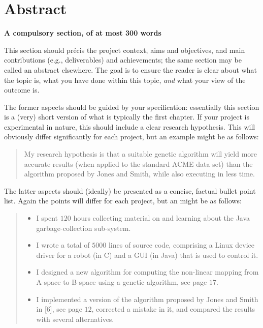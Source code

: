\documentclass[oneside,%
                    author={Malak Hajji},
                    degree={BSc},
                    title={Designing An Accessible Computational Toolkit For Students},
                  subtitle={With Mixed Visual Abilities}]{dissertation}
\begin{document}
\frontmatter





\chapter*{Abstract}

{\bf A compulsory section, of at most 300 words} 
\vspace{1cm} 

\noindent
This section should pr\'{e}cis the project context, aims and objectives,
and main contributions (e.g., deliverables) and achievements; the same 
section may be called an abstract elsewhere.  The goal is to ensure the 
reader is clear about what the topic is, what you have done within this 
topic, {\em and} what your view of the outcome is.

The former aspects should be guided by your specification: essentially 
this section is a (very) short version of what is typically the first 
chapter. If your project is experimental in nature, this should include 
a clear research hypothesis.  This will obviously differ significantly
for each project, but an example might be as follows:

\begin{quote}
My research hypothesis is that a suitable genetic algorithm will yield
more accurate results (when applied to the standard ACME data set) than 
the algorithm proposed by Jones and Smith, while also executing in less
time.
\end{quote}

\noindent
The latter aspects should (ideally) be presented as a concise, factual 
bullet point list.  Again the points will differ for each project, but 
an might be as follows:

\begin{quote}
\noindent
\begin{itemize}
\item I spent $120$ hours collecting material on and learning about the 
      Java garbage-collection sub-system. 
\item I wrote a total of $5000$ lines of source code, comprising a Linux 
      device driver for a robot (in C) and a GUI (in Java) that is 
      used to control it.
\item I designed a new algorithm for computing the non-linear mapping 
      from A-space to B-space using a genetic algorithm, see page $17$.
\item I implemented a version of the algorithm proposed by Jones and 
      Smith in [6], see page $12$, corrected a mistake in it, and 
      compared the results with several alternatives.
\end{itemize}
\end{quote}
\end{document}
